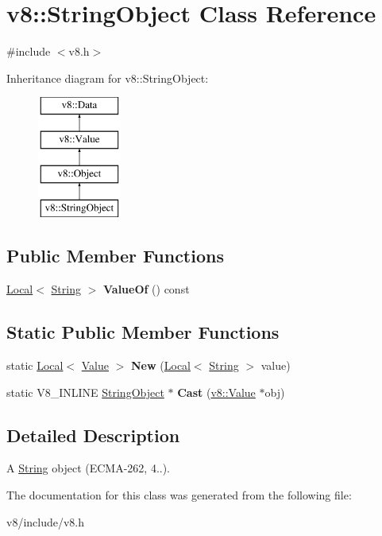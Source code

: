 \hypertarget{classv8_1_1StringObject}{}\section{v8\+:\+:String\+Object Class Reference}
\label{classv8_1_1StringObject}


{\ttfamily \#include $<$v8.\+h$>$}

Inheritance diagram for v8\+:\+:String\+Object\+:\begin{figure}[H]
\begin{center}
\leavevmode
\includegraphics[height=4.000000cm]{classv8_1_1StringObject}
\end{center}
\end{figure}
\subsection*{Public Member Functions}
\begin{DoxyCompactItemize}
\item 
\hyperlink{classv8_1_1Local}{Local}$<$ \hyperlink{classv8_1_1String}{String} $>$ {\bfseries Value\+Of} () const \hypertarget{classv8_1_1StringObject_a96bd6c736a0272ab7e683038953077e4}{}\label{classv8_1_1StringObject_a96bd6c736a0272ab7e683038953077e4}

\end{DoxyCompactItemize}
\subsection*{Static Public Member Functions}
\begin{DoxyCompactItemize}
\item 
static \hyperlink{classv8_1_1Local}{Local}$<$ \hyperlink{classv8_1_1Value}{Value} $>$ {\bfseries New} (\hyperlink{classv8_1_1Local}{Local}$<$ \hyperlink{classv8_1_1String}{String} $>$ value)\hypertarget{classv8_1_1StringObject_af343f21a3437b3aab91a7aba5b0a1952}{}\label{classv8_1_1StringObject_af343f21a3437b3aab91a7aba5b0a1952}

\item 
static V8\+\_\+\+I\+N\+L\+I\+NE \hyperlink{classv8_1_1StringObject}{String\+Object} $\ast$ {\bfseries Cast} (\hyperlink{classv8_1_1Value}{v8\+::\+Value} $\ast$obj)\hypertarget{classv8_1_1StringObject_af2169f0b4c890196416e4d28fbf76df8}{}\label{classv8_1_1StringObject_af2169f0b4c890196416e4d28fbf76df8}

\end{DoxyCompactItemize}


\subsection{Detailed Description}
A \hyperlink{classv8_1_1String}{String} object (E\+C\+M\+A-\/262, 4..). 

The documentation for this class was generated from the following file\+:\begin{DoxyCompactItemize}
\item 
v8/include/v8.\+h\end{DoxyCompactItemize}

